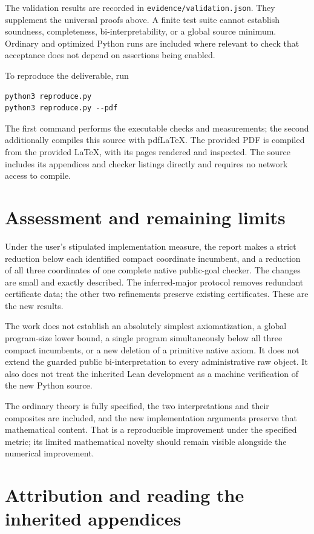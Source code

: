 The validation results are recorded in \texttt{evidence/validation.json}.
They supplement the universal proofs above. A finite test suite cannot
establish soundness, completeness, bi-interpretability, or a global source
minimum. Ordinary and optimized Python runs are included where relevant
to check that acceptance does not depend on assertions being enabled.

To reproduce the deliverable, run
\begin{lstlisting}
python3 reproduce.py
python3 reproduce.py --pdf
\end{lstlisting}
The first command performs the executable checks and measurements; the
second additionally compiles this source with pdfLaTeX. The provided PDF
is compiled from the provided LaTeX, with its pages rendered and inspected.
The source includes its appendices and checker listings directly and
requires no network access to compile.

\section{Assessment and remaining limits}

Under the user's stipulated implementation measure, the report makes a
strict reduction below each identified compact coordinate incumbent, and
a reduction of all three coordinates of one complete native public-goal
checker. The changes are small and exactly described. The inferred-major
protocol removes redundant certificate data; the other two refinements
preserve existing certificates. These are the new results.

The work does not establish an absolutely simplest axiomatization,
a global program-size lower bound, a single program simultaneously below
all three compact incumbents, or a new deletion of a primitive native
axiom. It does not extend the guarded public bi-interpretation to every
administrative raw object. It also does not treat the inherited Lean
development as a machine verification of the new Python source.

The ordinary theory is fully specified, the two interpretations and their
composites are included, and the new implementation arguments preserve
that mathematical content. That is a reproducible improvement under the
specified metric; its limited mathematical novelty should remain visible
alongside the numerical improvement.

\clearpage
\appendix
\section{Attribution and reading the inherited appendices}

